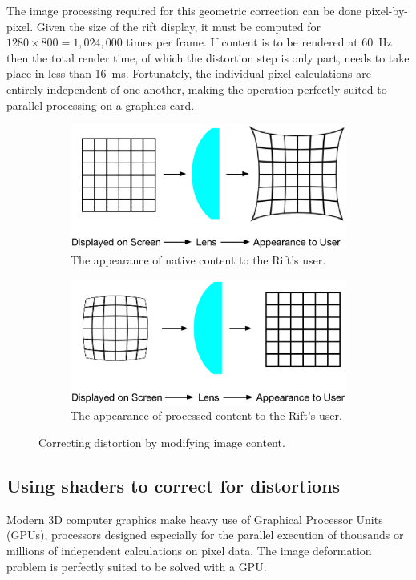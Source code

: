 \documentclass[MSc,paper=a4,pagesize=auto]{icldt}
\begin{document}
The image processing required for this geometric correction can be done pixel-by-pixel. Given the size of the rift display, it must be computed for $1280 \times 800 = 1,024,000$ times per frame. If content is to be rendered at \SI{60}{Hz} then the total render time, of which the distortion step is only part, needs to take place in less than \SI{16}{ms}. Fortunately, the individual pixel calculations are entirely independent of one another, making the operation perfectly suited to parallel processing on a graphics card. 


\begin{figure}[htbp!]
\centering
\begin{subfigure}{0.8\textwidth}
    \centering
    \includegraphics[width=0.8\linewidth]{resources/appearance_unprocessed}
    \caption{The appearance of native content to the Rift's user.}
	\label{fig:appearance_unprocessed}
\end{subfigure}
\centering
\begin{subfigure}{0.8\textwidth}
    \centering
    \includegraphics[width=0.8\linewidth]{resources/appearance_processed}
    \caption{The appearance of processed content to the Rift's user.}
	\label{fig:appearance_processed}
\end{subfigure}    
    \caption{Correcting distortion by modifying image content.}
    \label{fig:processing_content}
\end{figure}

\subsection{Using shaders to correct for distortions}
Modern 3D computer graphics make heavy use of Graphical Processor Units (GPUs), processors designed especially for the parallel execution of thousands or millions of independent calculations on pixel data. The image deformation problem is perfectly suited to be solved with a GPU. 
\end{document}
